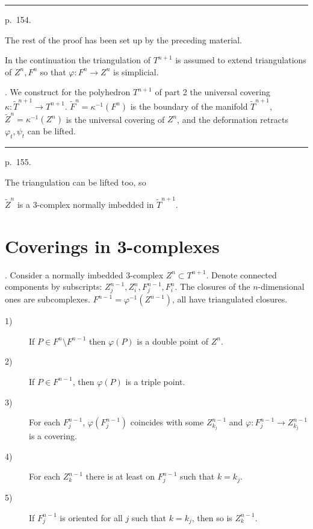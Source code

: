 \documentclass{amsart}
\theoremstyle{plain}
\theoremstyle{definition}
\begin{document}
\medskip
\hrule\smallskip
\noindent p.~154.
\medskip

The rest of the proof has been set up by the preceding material.

In the continuation the triangulation of $T^{n+1}$ is assumed
to extend triangulations of $Z^n, F^n$ so that $\varphi : F^n
\to Z^n$ is simplicial.

. We construct for the polyhedron $T^{n+1}$ of part 2 the
universal covering $\kappa : \tilde T^{n+1} \to T^{n+1}$.
$\tilde F^n = \kappa^{-1}(F^n)$ is the boundary of the manifold
$\tilde T^{n+1}$, $\tilde Z^n = \kappa^{-1}(Z^n)$ is the universal
covering of $Z^n$, and the deformation retracts $\varphi_t,
\psi_t$ can be lifted.

\medskip
\hrule\smallskip
\noindent p.~155.
\medskip

The triangulation can be lifted too, so
\begin{lem}\label{Lemma 5} $\tilde Z^n$ is a 3-complex normally
imbedded in $\tilde T^{n+1}$.
\end{lem}

\section{Coverings in 3-complexes}\label{sec:cover}

. Consider a normally imbedded 3-complex $Z^n \subset T^{n+1}$.
Denote connected components by subscripts: $Z^{n-1}_j, Z^n_i,
F^{n-1}_j, F^n_i$. The closures of the $n$-dimensional ones are
subcomplexes. $F^{n-1} = \varphi^{-1}(Z^{n-1})$, all have
triangulated closures.
\begin{lem}\label{Lemma 6} 
\begin{description}
\item[1)] If $P\in F^n \setminus F^{n-1}$ then
$\varphi(P)$ is a double point of $Z^n$.
\item[2)] If $P \in F^{n-1}$, then $\varphi(P)$ is a triple point.
\item[3)] For each $F^{n-1}_j$, $\varphi(F^{n-1}_j)$ coincides
with some $Z^{n-1}_{k_j}$ and
$\varphi : F^{n-1}_j \to Z^{n-1}_{k_j}$ is a covering.
\item[4)] For each $Z^{n-1}_k$ there is at least on $F^{n-1}_j$
such that $k = k_j$.
\item[5)] If $F^{n-1}_j$ is oriented for all $j$ such that
$k = k_j$, then so is $Z^{n-1}_k$.
\end{description}
\end{lem}
\end{document}
